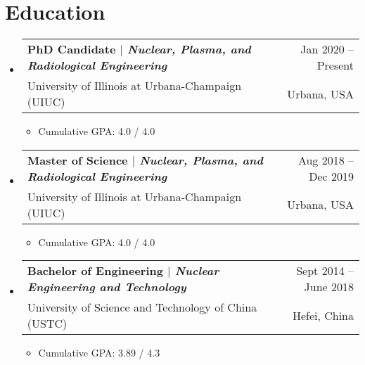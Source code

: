 \documentclass[letterpaper,11pt]{article} %
\makeatletter
\newcommand{\CVItem}[1]{
  \item\small{
    {#1 \vspace{-2pt}}
  }
}
\newcommand{\CVSubheading}[4]{
  \vspace{-2pt}\item
    \begin{tabular*}{0.97\textwidth}[t]{l@{\extracolsep{\fill}}r}
      \textbf{#1} & #2 \\
      \small#3 & \small #4 \\
    \end{tabular*}\vspace{-7pt}
}
\newcommand{\CVSubHeadingListStart}{\begin{itemize}[leftmargin=0.5cm, label={}]}
\newcommand{\CVSubHeadingListEnd}{\end{itemize}}
\newcommand{\CVItemListStart}{\begin{itemize}}
\newcommand{\CVItemListEnd}{\end{itemize}\vspace{-5pt}}
\makeatother
\begin{document}
\section{Education}
  \CVSubHeadingListStart
    \CVSubheading
      {{PhD Candidate $|$ \emph{\small{Nuclear, Plasma, and Radiological Engineering}}}}{Jan 2020 -- Present}
      {University of Illinois at Urbana-Champaign (UIUC)}{Urbana, USA}
      \CVItemListStart
        \CVItem{Cumulative GPA:  4.0 / 4.0}
      \CVItemListEnd
    \CVSubheading
      {{Master of Science $|$ \emph{\small{Nuclear, Plasma, and Radiological Engineering}}}}{Aug 2018 -- Dec 2019}
      {University of Illinois at Urbana-Champaign (UIUC)}{Urbana, USA}
       \CVItemListStart
        \CVItem{Cumulative GPA:  4.0 / 4.0}
      \CVItemListEnd
    \CVSubheading
      {{Bachelor of Engineering $|$ \emph{\small{Nuclear Engineering and Technology}}}}{Sept 2014 -- June 2018}
      {University of Science and Technology of China (USTC)}{Hefei, China}
       \CVItemListStart
        \CVItem{Cumulative GPA:  3.89 / 4.3}
      \CVItemListEnd
  \CVSubHeadingListEnd

\begin{comment}
try to briefly explain what you did and why it is relevant to the position you
are seeking
\end{comment}
\begin{comment}
Ideally the title of the work should speak for what it is. However if you feel
like you should explain more about why the project is applicable to this job,
use item list as is shown in the work experience section.
\end{comment}
\end{document}
